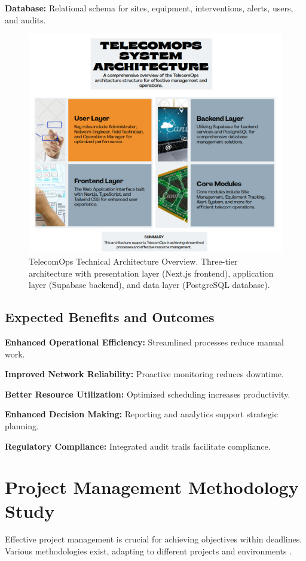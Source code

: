 \textbf{Database:} Relational schema for sites, equipment, interventions, alerts, users, and audits.

\begin{figure}[H]
    \centering
    \includegraphics[width=0.85\columnwidth]{img/TELECOMOPS SYSTEM ARCHITECTURE.png}
    \caption{TelecomOps Technical Architecture Overview. Three-tier architecture with presentation layer (Next.js frontend), application layer (Supabase backend), and data layer (PostgreSQL database).}
    \label{fig:architecture}
\end{figure}

\subsection{Expected Benefits and Outcomes}
\textbf{Enhanced Operational Efficiency:} Streamlined processes reduce manual work.  

\textbf{Improved Network Reliability:} Proactive monitoring reduces downtime.  

\textbf{Better Resource Utilization:} Optimized scheduling increases productivity.  

\textbf{Enhanced Decision Making:} Reporting and analytics support strategic planning.  

\textbf{Regulatory Compliance:} Integrated audit trails facilitate compliance.

\section{Project Management Methodology Study}
Effective project management is crucial for achieving objectives within deadlines. Various methodologies exist, adapting to different projects and environments \cite{agilemanifesto, scrumguide, beck2004xp}.


